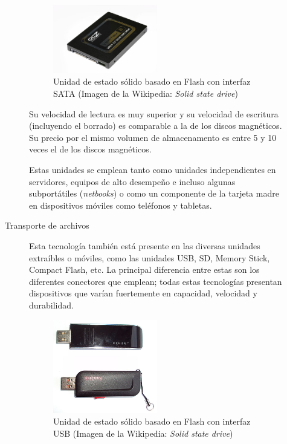 \documentclass[11pt,fleqn]{book} %
\begin{document}
\begin{description}
\begin{description}
       \begin{figure}[htb]
       \centering
       \includegraphics[width=0.5\textwidth]{./img/estado_solido_sata.jpg}
       \caption{Unidad de estado sólido basado en Flash con interfaz SATA (Imagen de la Wikipedia: \emph{Solid state drive})}
       \end{figure}

       Su velocidad de lectura es muy superior y su velocidad de
       escritura (incluyendo el borrado) es comparable a la de los
       discos magnéticos. Su precio por el mismo volumen de
       almacenamento es entre 5 y 10 veces el de los discos
       magnéticos.

       Estas unidades se emplean tanto como unidades
       independientes en servidores, equipos de alto desempeño e
       incluso algunas subportátiles (\emph{netbooks}) o como un
       componente de la tarjeta madre en dispositivos móviles como
       teléfonos y tabletas.
\item[Transporte de archivos] Esta tecnología también está presente en
       las diversas unidades extraíbles o móviles, como las unidades
       USB, SD, Memory Stick, Compact Flash, etc. La principal
       diferencia entre estas son los diferentes conectores que
       emplean; todas estas tecnologías presentan dispositivos que
       varían fuertemente en capacidad, velocidad y durabilidad.

       \begin{figure}[htb]
       \centering
       \includegraphics[width=0.5\textwidth]{./img/estado_solido_usb.jpg}
       \caption{Unidad de estado sólido basado en Flash con interfaz USB (Imagen de la Wikipedia: \emph{Solid state drive})}
       \end{figure}
\end{description}
\end{description}
\end{document}

